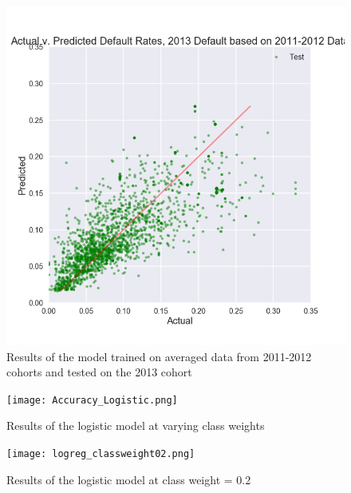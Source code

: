\documentclass[10pt,twocolumn]{article}
\begin{document}
\begin{figure}[!t]
  \begin{center}
    \includegraphics[width=\textwidth]{2013blended.png}
  \end{center}

  \caption{\Figure Results of the model trained on averaged data from 2011-2012 cohorts
  and tested on the 2013 cohort}
  \label{2013blended}
\end{figure}

\begin{figure}[!t]
  \begin{center}
    \texttt{[image: Accuracy\_Logistic.png]}
  \end{center}

  \caption{\Figure Results of the logistic model at varying class weights}
  \label{accuracy}
\end{figure}


\begin{figure}[!t]
  \begin{center}
    \texttt{[image: logreg\_classweight02.png]}
  \end{center}

  \caption{\Figure Results of the logistic model at class weight = 0.2}
  \label{log_unbalanced}
\end{figure}
\end{document}
